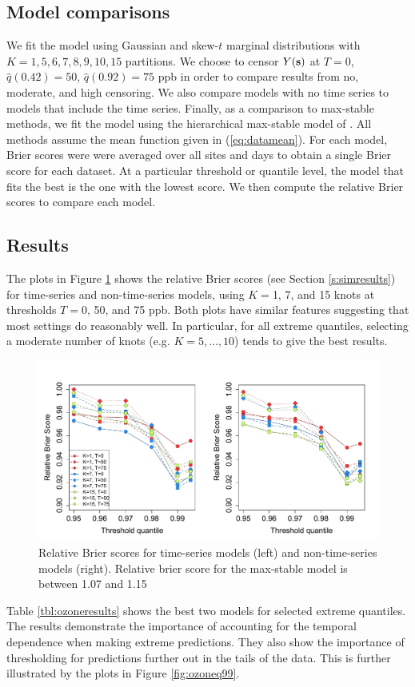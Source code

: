 \documentclass[11pt]{article}
\begin{document}
\subsection{Model comparisons}
We fit the model using Gaussian and skew-$t$ marginal distributions with $K=1, 5, 6, 7, 8, 9, 10, 15$ partitions.
We choose to censor $Y(\mbox{\bf s})$ at $T = 0$, $\widehat{q}(0.42) = 50$, $\widehat{q}(0.92)=75$ ppb in order to compare results from no, moderate, and high censoring.
We also compare models with no time series to models that include the time series.
Finally, as a comparison to max-stable methods, we fit the model using the hierarchical max-stable model of \citet{Reich2012}.
All methods assume the mean function given in (\ref{eq:datamean}).
For each model, Brier scores were were averaged over all sites and days to obtain a single Brier score for each dataset.
At a particular threshold or quantile level, the model that fits the best is the one with the lowest score.
We then compute the relative Brier scores to compare each model.

\subsection{Results}\label{s:results}
The plots in Figure \ref{fig:bs-ozone} shows the relative Brier scores (see Section \ref{s:simresults}) for time-series and non-time-series models, using $K = $1, 7, and 15 knots at thresholds $T = $0, 50, and 75 ppb.
Both plots have similar features suggesting that most settings do reasonably well.
In particular, for all extreme quantiles, selecting a moderate number of knots (e.g. $K = 5, \ldots, 10$) tends to give the best results.
\begin{figure}
  \includegraphics[width=\linewidth]{plots/bs-ozone.pdf}
  \caption{Relative Brier scores for time-series models (left) and non-time-series models (right). Relative brier score for the max-stable model is between 1.07 and 1.15}
  \label{fig:bs-ozone}
\end{figure}
Table \ref{tbl:ozoneresults} shows the best two models for selected extreme quantiles.
The results demonstrate the importance of accounting for the temporal dependence when making extreme predictions.
They also show the importance of thresholding for predictions further out in the tails of the data.
This is further illustrated by the plots in Figure \ref{fig:ozoneq99}.
\end{document}
